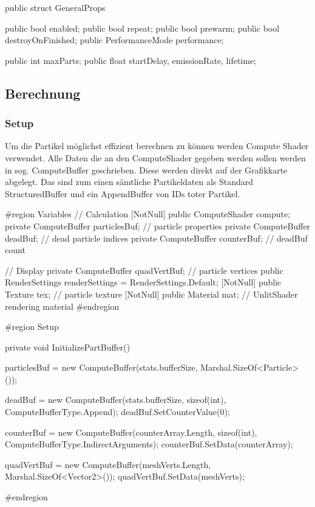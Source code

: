 \begin{csh}
public struct GeneralProps
{
    public bool enabled;
    public bool repeat;
    public bool prewarm;
    public bool destroyOnFinished;
    public PerformanceMode performance;

    public int maxParts;
    public float startDelay, emissionRate, lifetime;
}
\end{csh}



\subsection{Berechnung}


\subsubsection{Setup}

Um die Partikel möglichst effizient berechnen zu können werden Compute Shader verwendet. Alle Daten die an den ComputeShader gegeben werden sollen werden in sog. ComputeBuffer geschrieben. Diese werden direkt auf der Grafikkarte abgelegt. Das sind zum einen sämtliche Partikeldaten als Standard StructuredBuffer und ein AppendBuffer von IDs toter Partikel.

\begin{csh}[caption=Controller Setup,label=lst:partSetup]
#region Variables
// Calculation
[NotNull] public ComputeShader compute;
private ComputeBuffer particlesBuf; // particle properties
private ComputeBuffer deadBuf;      // dead particle indices
private ComputeBuffer counterBuf;   // deadBuf count

// Display
private ComputeBuffer quadVertBuf;  // particle vertices
public RenderSettings renderSettings = RenderSettings.Default;
[NotNull] public Texture tex;  // particle texture
[NotNull] public Material mat; // UnlitShader rendering material
#endregion

#region Setup

private void InitializePartBuffer()
{
    particlesBuf = new ComputeBuffer(stats.bufferSize, Marshal.SizeOf<Particle>());

    deadBuf = new ComputeBuffer(stats.bufferSize, sizeof(int), ComputeBufferType.Append);
    deadBuf.SetCounterValue(0);

    counterBuf = new ComputeBuffer(counterArray.Length, sizeof(int), ComputeBufferType.IndirectArguments);
    counterBuf.SetData(counterArray);

    quadVertBuf = new ComputeBuffer(meshVerts.Length, Marshal.SizeOf<Vector2>());
    quadVertBuf.SetData(meshVerts);
}

#endregion
\end{csh}

